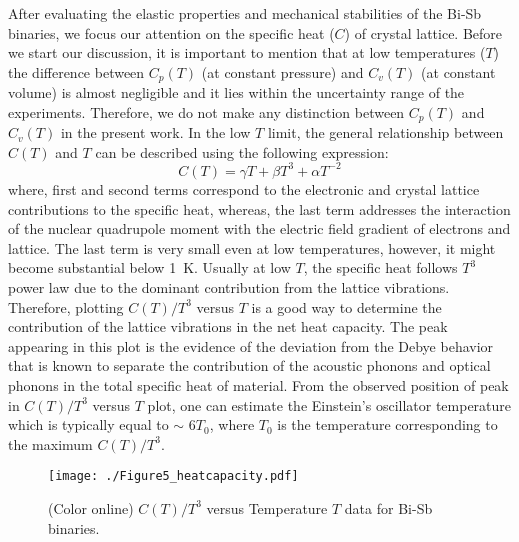 \documentclass[twocolumn,superscriptaddress,nofootinbib,floatfix,aps,showpacs,prb,citeautoscript,reprint]{revtex4-1}
\begin{document}
After evaluating the elastic properties and mechanical stabilities of the Bi-Sb binaries, we focus our attention on the specific heat ($C$) of crystal lattice. Before we start our discussion, it is important to mention that at low temperatures ($T$) the difference between $C_{p}(T)$ (at constant pressure) and $C_{v}(T)$ (at constant volume) is almost negligible and it lies within the uncertainty range of the experiments.\cite{Cardona2007} Therefore, we do not make any distinction between $C_{p}(T)$ and $C_{v}(T)$ in the present work. In the low $T$ limit, the general relationship between $C(T)$ and $T$ can be described using the following expression: 
\begin{equation}
C(T) = \gamma T + \beta T^{3} + \alpha T^{-2}
\end{equation}
where, first and second terms correspond to the electronic and crystal lattice contributions to the specific heat, whereas, the last term addresses the interaction of the nuclear quadrupole moment with the electric field gradient of electrons and lattice. The last term is very small even at low temperatures, however, it might become substantial below 1~K. \cite{SbSOC_PRB2008} Usually at low $T$, the specific heat follows $T^3$ power law due to the dominant contribution from the lattice vibrations. Therefore, plotting $C(T)/T^3$ versus $T$ is a good way to determine the contribution of the lattice vibrations in the net heat capacity. \cite{KremerGaN2005, SbSOC_PRB2008, Cardona2007, Cardona2009} The peak appearing in this plot is the evidence of the deviation from the Debye behavior that is known to separate the contribution of the acoustic phonons and optical phonons in the total specific heat of material. From the observed position of peak in $C(T)/T^3$ versus $T$ plot, one can estimate the Einstein's oscillator temperature which is typically equal to $\sim$ 6$T_{0}$, where $T_{0}$ is the temperature corresponding to the maximum $C(T)/T^3$.\cite{Cardona2007, Cardona2009}


\begin{figure}[htb!]
 \centering
 \texttt{[image: ./Figure5\_heatcapacity.pdf]}
 \caption{(Color online) $C(T)/T^3$ versus Temperature $T$ data for Bi-Sb binaries. }
  \label{fig:specificheat}
 \end{figure}
\end{document}
